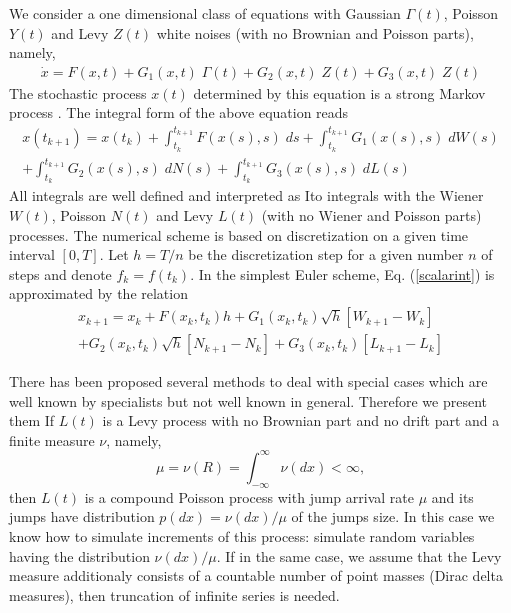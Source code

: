 \documentclass[authoryear,draft,1p,times]{elsarticle}
\newcommand{\be}{\begin{equation}}
\newcommand{\ee}{\end{equation}}
\renewcommand{\=}{\stackrel{\mathrm{d}}{=}}
\begin{document}
We  consider a one dimensional class of equations  with Gaussian $\Gamma(t)$, Poisson $Y(t)$ and Levy $Z(t)$ 
 white noises (with no Brownian and Poisson parts), namely,  
%
\begin{eqnarray}
\label{scalardif}
\dot x =   F(x, t) + G_{1}(x, t) \;  \Gamma (t) + G_{2}(x, t) \;  Z (t) +
G_{3}(x, t) \;  Z(t)   
\end{eqnarray}
%
The stochastic process $x(t)$  determined by this equation is a strong Markov process \cite{jacod}. 
The integral form of the above  equation reads 
%
\begin{eqnarray}
\label{scalarint}
x(t_{k+1}) = x(t_k) +  \int_{t_k}^{t_{k+1}}  F(x(s), s) \;ds +  
\int_{t_k}^{t_{k+1}}  G_{1}(x(s), s) \;dW(s) \nonumber \\
 +    \int_{t_k}^{t_{k+1}}  G_{2}(x(s), s) \;dN(s)  
+  \int_{t_k}^{t_{k+1}}  G_{3}(x(s), s) \;dL(s)    
\end{eqnarray}
%
All integrals are well defined and interpreted  as Ito integrals with the Wiener $W(t)$, Poisson $N(t)$ and Levy $L(t)$ 
(with no Wiener  and Poisson parts) processes. 
The numerical scheme is based on discretization on a given time interval $[0, T]$. Let 
$h=T/n$ be the discretization step for a given number $n$ of steps and denote $f_k =f(t_k)$. 
In the simplest Euler scheme,  Eq. (\ref{scalarint}) 
is approximated by the  relation  
%
\begin{eqnarray}
\label{scalarite}
x_{k+1} = x_k + F(x_k, t_k) h + G_1(x_k, t_k) \sqrt{h} [W_{k+1} -W_k] \nonumber\\
+ G_2(x_k, t_k) \sqrt{h} [N_{k+1} -N_k]  
+ G_3(x_k, t_k)   [L_{k+1} -L_k]  
\end{eqnarray}
%




 There  has been proposed  several  methods to deal with special cases which are well known by 
specialists but not well known  in general.  Therefore we present them 
If $L(t)$ is a Levy process with no Brownian part and no drift part and a finite measure $\nu$, namely, 
%
\be
\mu=\nu(R) =\int_{-\infty}^{\infty} \nu(dx)  < \infty, 
\ee
%
 then $L(t)$ is a compound Poisson process with jump arrival rate 
$\mu$ and its jumps have distribution $p(dx)=\nu(dx)/\mu$ of the jumps size.   In this case we know how  to simulate increments 
of this process: simulate random variables having  the  distribution $\nu(dx)/\mu$. 
 If in the same case, we assume that the Levy measure   additionaly  consists of a countable number of point masses (Dirac delta measures),  then truncation of infinite series is needed.  
\end{document}

